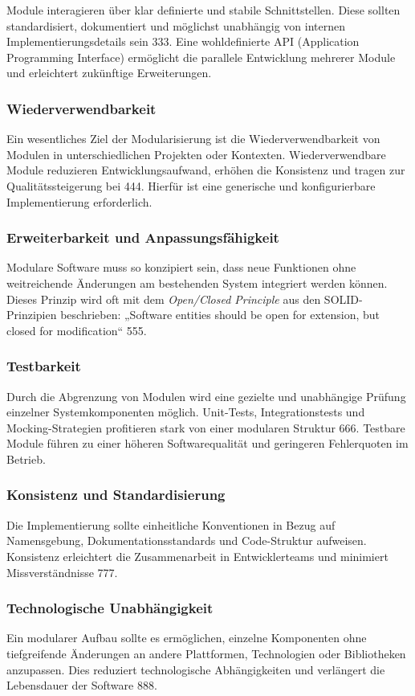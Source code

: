 Module interagieren über klar definierte und stabile Schnittstellen. Diese sollten standardisiert, dokumentiert und möglichst unabhängig von internen Implementierungsdetails sein 333. Eine wohldefinierte API (Application Programming Interface) ermöglicht die parallele Entwicklung mehrerer Module und erleichtert zukünftige Erweiterungen.


\subsubsection{Wiederverwendbarkeit}

Ein wesentliches Ziel der Modularisierung ist die Wiederverwendbarkeit von Modulen in unterschiedlichen Projekten oder Kontexten. Wiederverwendbare Module reduzieren Entwicklungsaufwand, erhöhen die Konsistenz und tragen zur Qualitätssteigerung bei 444. Hierfür ist eine generische und konfigurierbare Implementierung erforderlich.


\subsubsection{Erweiterbarkeit und Anpassungsfähigkeit}

Modulare Software muss so konzipiert sein, dass neue Funktionen ohne weitreichende Änderungen am bestehenden System integriert werden können. Dieses Prinzip wird oft mit dem \textit{Open/Closed Principle} aus den SOLID-Prinzipien beschrieben: „Software entities should be open for extension, but closed for modification“ 555.


\subsubsection{Testbarkeit}

Durch die Abgrenzung von Modulen wird eine gezielte und unabhängige Prüfung einzelner Systemkomponenten möglich. Unit-Tests, Integrationstests und Mocking-Strategien profitieren stark von einer modularen Struktur 666. Testbare Module führen zu einer höheren Softwarequalität und geringeren Fehlerquoten im Betrieb.


\subsubsection{Konsistenz und Standardisierung}

Die Implementierung sollte einheitliche Konventionen in Bezug auf Namensgebung, Dokumentationsstandards und Code-Struktur aufweisen. Konsistenz erleichtert die Zusammenarbeit in Entwicklerteams und minimiert Missverständnisse 777.


\subsubsection{Technologische Unabhängigkeit}

Ein modularer Aufbau sollte es ermöglichen, einzelne Komponenten ohne tiefgreifende Änderungen an andere Plattformen, Technologien oder Bibliotheken anzupassen. Dies reduziert technologische Abhängigkeiten und verlängert die Lebensdauer der Software 888.

